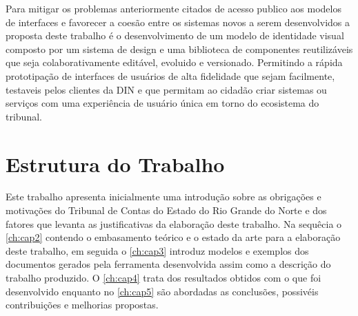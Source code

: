   Para mitigar os problemas anteriormente citados de acesso publico aos modelos de interfaces e favorecer a coesão entre os sistemas novos a serem desenvolvidos a proposta deste trabalho é o desenvolvimento de um modelo de identidade visual composto por um sistema de design e uma biblioteca de componentes reutilizáveis que seja colaborativamente editável, evoluido e versionado. Permitindo a rápida prototipação de interfaces de usuários de alta fidelidade que sejam facilmente, testaveis pelos clientes da DIN e que permitam ao cidadão criar sistemas ou serviços com uma experiência de usuário única em torno do ecosistema do tribunal.



  \section{Estrutura do Trabalho}
  Este trabalho apresenta inicialmente uma introdução sobre as obrigações e motivações do Tribunal de Contas do Estado do Rio Grande do Norte e dos fatores que levanta as justificativas da elaboração deste trabalho.
  Na sequêcia o \autoref{ch:cap2} contendo o embasamento teórico e o estado da arte para a elaboração deste trabalho, em seguida o \autoref{ch:cap3} introduz modelos e exemplos dos documentos gerados pela ferramenta desenvolvida assim como a descrição do trabalho produzido. O \autoref{ch:cap4} trata dos resultados obtidos com o que foi desenvolvido enquanto no \autoref{ch:cap5} são abordadas as conclusões, possivéis contribuições e melhorias propostas.

